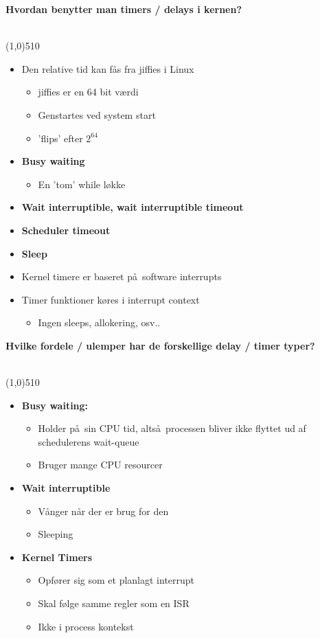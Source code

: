 \documentclass{paper}
\begin{document}
\begin{large}\textbf{Hvordan benytter man timers / delays i kernen?}\end{large}\\
\line(1,0){510}
\begin{itemize}
\item Den relative tid kan f\aa s fra jiffies i Linux
	\begin{itemize}
	\item jiffies er en 64 bit v\ae rdi
	\item Genstartes ved system start
	\item 'flips' efter $2^{64}$
	\end{itemize}
\item \textbf{Busy waiting}
	\begin{itemize}
	\item En 'tom' while l\o kke
	\end{itemize}
\item \textbf{Wait interruptible, wait interruptible timeout}
\item \textbf{Scheduler timeout}
\item \textbf{Sleep}

\item Kernel timere er baseret p\aa\ software interrupts
\item Timer funktioner k\o res i interrupt context
	\begin{itemize}
	\item Ingen sleeps, allokering, osv..\\
	\end{itemize}
\end{itemize}


\begin{large}\textbf{Hvilke fordele / ulemper har de forskellige delay / timer typer?}\end{large}\\
\line(1,0){510}
\begin{itemize}
\item \textbf{Busy waiting:}
	\begin{itemize}
	\item Holder p\aa\ sin CPU tid, alts\aa\ processen bliver ikke flyttet ud af schedulerens wait-queue
	\item Bruger mange CPU resourcer
	\end{itemize}
\item \textbf{Wait interruptible}
	\begin{itemize}
		\item V\aa nger n\aa r der er brug for den
		\item Sleeping
	\end{itemize}
\item \textbf{Kernel Timers}
	\begin{itemize}
	\item Opf\o rer sig som et planlagt interrupt
	\item Skal f\o lge samme regler som en ISR
	\item Ikke i process kontekst
	\end{itemize}
\end{itemize}
\end{document}

